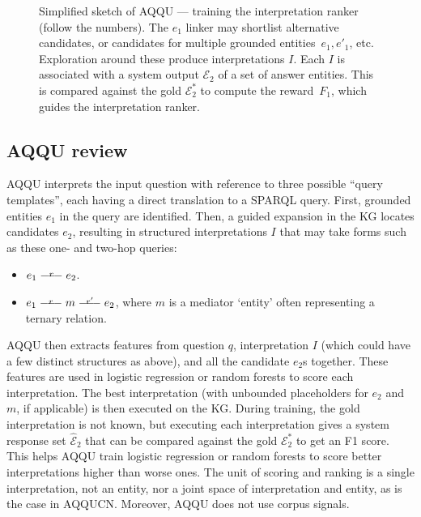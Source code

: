 \documentclass{svjour3}
\def\longbar{\relbar\joinrel\relbar\joinrel\relbar}
\begin{document}
\begin{figure}[ht]
\caption{Simplified sketch of AQQU \citep{BastH2015aqqu} --- training the interpretation ranker (follow the numbers).  The $e_1$ linker may shortlist alternative candidates, or candidates for multiple grounded entities~$e_1, e'_1$, etc.  Exploration around these produce interpretations $I$.  Each $I$ is associated with a system output $\mathcal{E}_2$ of a set of answer entities.  This is compared against the gold $\mathcal{E}^*_2$ to compute the reward~$F_1$, which guides the interpretation ranker.}
\label{fig:AQQU}
\end{figure}


\subsection{AQQU review}
\label{sec:AqquReview}

AQQU interprets the input question with reference to three possible ``query templates'', each having a direct translation to a SPARQL query.  First, grounded entities $e_1$ in the query are identified.  Then, a guided expansion in the KG locates candidates $e_2$, resulting in structured interpretations $I$ that may take forms such as these one- and two-hop queries:
\begin{itemize}
\item $e_1 \stackrel{r}{\longbar} e_2$.
\item $e_1 \stackrel{r}{\longbar} m
\stackrel{r'}{\longbar} e_2$, where $m$ is a mediator `entity' often representing a ternary relation.
\end{itemize}
AQQU then extracts features from question $q$, interpretation $I$ (which could have a few distinct structures as above), and all the candidate $e_2$s together.  These features are used in logistic regression or random forests to score each interpretation.  The best interpretation (with unbounded placeholders for $e_2$ and $m$, if applicable) is then executed on the KG.  During training, the gold interpretation is not known, but executing each interpretation gives a system response set $\hat{\mathcal{E}}_2$ that can be compared against the gold $\mathcal{E}^*_2$ to get an F1 score.  This helps AQQU train logistic regression or random forests to score better interpretations higher than worse ones.  The unit of scoring and ranking is a single interpretation, not an entity, nor a joint space of interpretation and entity, as is the case in AQQUCN.  Moreover, AQQU does not use corpus signals.
\end{document}

